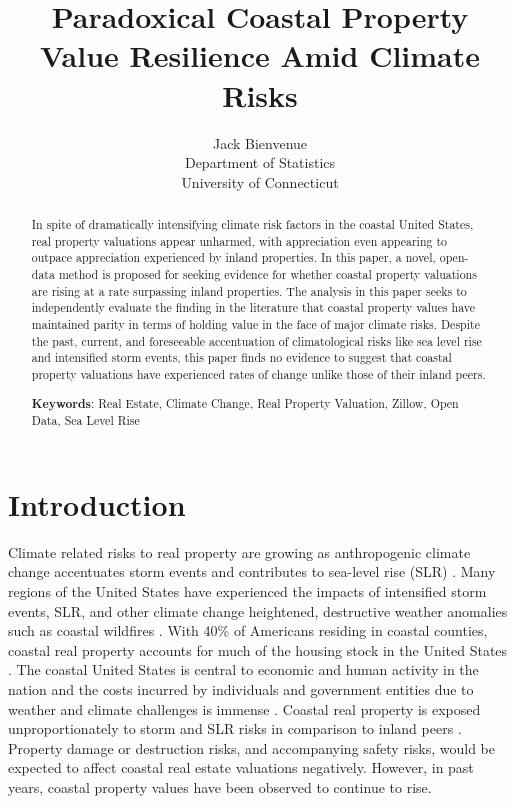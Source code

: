 \documentclass[12pt]{article}
\title{Paradoxical Coastal Property Value Resilience Amid Climate Risks}
\author{Jack Bienvenue\\
  Department of Statistics\\
  University of Connecticut
}
\begin{document}
\maketitle

\begin{abstract}

In spite of dramatically intensifying climate risk factors in the coastal United States, real property valuations appear unharmed, with appreciation even appearing to outpace appreciation experienced by inland properties. In this paper, a novel, open-data method is proposed for seeking evidence for whether coastal property valuations are rising at a rate surpassing inland properties. The analysis in this paper seeks to independently evaluate the finding in the literature that coastal property values have maintained parity in terms of holding value in the face of major climate risks. Despite the past, current, and foreseeable accentuation of climatological risks like sea level rise and intensified storm events, this paper finds no evidence to suggest that coastal property valuations have experienced rates of change unlike those of their inland peers. 

\noindent\textbf{Keywords}: Real Estate, Climate Change, Real Property Valuation, Zillow, Open Data, Sea Level Rise
\end{abstract}


\section{Introduction}
\label{sec:intro}

Climate related risks to real property are growing as anthropogenic climate change accentuates storm events and contributes to sea-level rise (SLR) \citep{griggs2021coastal}. Many regions of the United States have experienced the impacts of intensified storm events, SLR, and other climate change heightened, destructive weather anomalies such as coastal wildfires \citep{reed2022attribution, swain2025increasing}. With 40\% of Americans residing in coastal counties, coastal real property accounts for much of the housing stock in the United States \citep{EPA2025}. The coastal United States is central to economic and human activity in the nation and the costs incurred by individuals and government entities due to weather and climate challenges is immense \citep{reed2022attribution}. Coastal real property is exposed unproportionately to storm and SLR risks in comparison to inland peers \citep{clayton2021climate}. Property damage or destruction risks, and accompanying safety risks, would be expected to affect coastal real estate valuations negatively. However, in past years, coastal property values have been observed to continue to rise. 
\end{document}
